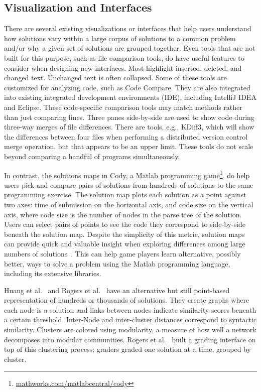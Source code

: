 
\subsection{Visualization and Interfaces}

There are several existing visualizations or interfaces that help users understand how solutions vary within a large corpus of solutions to a common problem and/or why a given set of solutions are grouped together. Even tools that are not built for this purpose, such as file comparison tools, do have useful features to consider when designing new interfaces. Most highlight inserted, deleted, and changed text. Unchanged text is often collapsed. Some of these tools are customized for analyzing code, such as Code Compare. They are also integrated into existing integrated development environments (IDE), including IntelliJ IDEA and Eclipse. These code-specific comparison tools may match methods rather than just comparing lines. Three panes side-by-side are used to show code during three-way merges of file differences. There are tools, e.g., KDiff3, which will show the differences between four files when performing a distributed version control merge operation, but that appears to be an upper limit. These tools do not scale beyond comparing a handful of programs simultaneously.


In contrast, the solutions maps in Cody, a Matlab programming game\footnote{\url{mathworks.com/matlabcentral/cody}}, do help users pick and compare pairs of solutions from hundreds of solutions to the same programming exercise. The solution map plots each solution as a point against two axes: time of submission on the horizontal axis, and code size on the vertical axis, where code size is the number of nodes in the parse tree of the solution. Users can select pairs of points to see the code they correspond to side-by-side beneath the solution map. Despite the simplicity of this metric, solution maps can provide quick and valuable insight when exploring differences among large numbers of solutions~\cite{ICERGlassman}. This can help game players learn alternative, possibly better, ways to solve a problem using the Matlab programming language, including its extensive libraries.

Huang et al.~\cite{MOOCshop} and Rogers et al.~\cite{ACESthesis} have an alternative but still point-based representation of hundreds or thousands of solutions. They create graphs where each node is a solution and links between nodes indicate similarity scores beneath a certain threshold. Inter-Node and inter-cluster distances correspond to syntactic similarity. Clusters are colored using modularity, a measure of how well a network decomposes into modular communities. Rogers et al.~\cite{ACESthesis} built a grading interface on top of this clustering process; graders graded one solution at a time, grouped by cluster.

